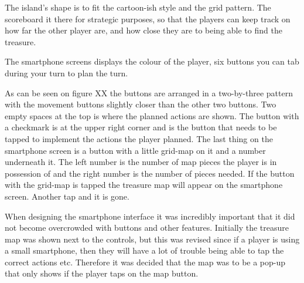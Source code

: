 The island’s shape is to fit the cartoon-ish style and the grid pattern. The scoreboard it there for strategic purposes, so that the players can keep track on how far the other player are, and how close they are to being able to find the treasure. 


The smartphone screens displays the colour of the player, six buttons you can tab during your turn to plan the turn. 


As can be seen on figure XX the buttons are arranged in a two-by-three pattern with the movement buttons slightly closer than the other two buttons. Two empty spaces at the top is where the planned actions are shown. The button with a checkmark is at the upper right corner and is the button that needs to be tapped to implement the actions the player planned. The last thing on the smartphone screen is a button with a little grid-map on it and a number underneath it. The left number is the number of map pieces the player is in possession of and the right number is the number of pieces needed. If the button with the grid-map is tapped the treasure map will appear on the smartphone screen. Another tap and it is gone. 


When designing the smartphone interface it was incredibly important that it did not become overcrowded with buttons and other features. Initially the treasure map was shown next to the controls, but this was revised since if a player is using a small smartphone, then they will have a lot of trouble being able to tap the correct actions etc. Therefore it was decided that the map was to be a pop-up that only shows if the player taps on the map button.  
